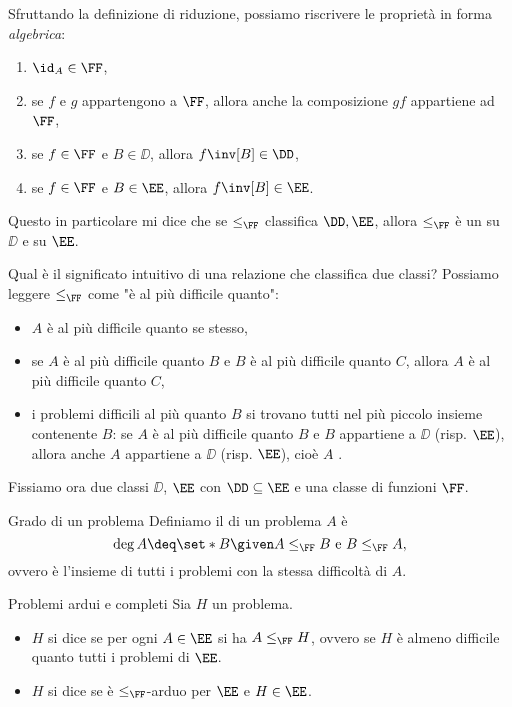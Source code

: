 \begin{remark}
    Sfruttando la definizione di riduzione, possiamo riscrivere le proprietà in forma \emph{algebrica}:
    \begin{enumerate}
        \item $\id_A \in \FF$,
        \item se $f$ e $g$ appartengono a $\FF$, allora anche la composizione $gf$ appartiene ad $\FF$,
        \item se $f \in \FF$ e $B \in \DD$, allora $f\inv[B] \in \DD$,
        \item se $f \in \FF$ e $B \in \EE$, allora $f\inv[B] \in \EE$.            
    \end{enumerate}
    Questo in particolare mi dice che se $\leq_\FF$ classifica $\DD, \EE$, allora $\leq_\FF$ è un  su $\DD$ e su $\EE$.
\end{remark}

 Qual è il significato intuitivo di una relazione che classifica due classi? Possiamo leggere $\leq_\FF$ come "è al più difficile quanto":
\begin{itemize}
    \item $A$ è al più difficile quanto se stesso,
    \item se $A$ è al più difficile quanto $B$ e $B$ è al più difficile quanto $C$, allora $A$ è al più difficile quanto $C$,
    \item i problemi difficili al più quanto $B$ si trovano tutti nel più piccolo insieme contenente $B$: se $A$ è al più difficile quanto $B$ e $B$ appartiene a $\DD$ (risp. $\EE$), allora anche $A$ appartiene a $\DD$ (risp. $\EE$), cioè $A$ .    
\end{itemize} 

Fissiamo ora due classi $\DD$, $\EE$ con $\DD \subseteq \EE$ e una classe di funzioni $\FF$.    

\begin{definition}
    {Grado di un problema}{}
    Definiamo il  di un problema $A$ è \[
        \deg A \deq \set*{B \given A \leq_\FF B \text{ e } B \leq_\FF A},
    \] ovvero è l'insieme di tutti i problemi con la stessa difficoltà di $A$. 
\end{definition}

\begin{definition}
    {Problemi ardui e completi}{}
    Sia $H$ un problema. \begin{itemize}
        \item $H$ si dice  se per ogni $A \in \EE$ si ha $A \leq_\FF H$, ovvero se $H$ è almeno difficile quanto tutti i problemi di $\EE$.
        \item $H$ si dice  se è $\leq_\FF$-arduo per $\EE$ e $H \in \EE$.    
    \end{itemize} 
\end{definition}


